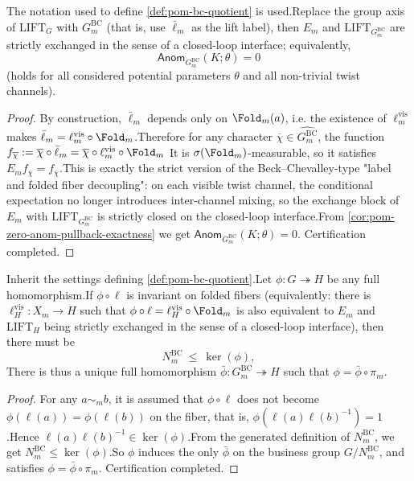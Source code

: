 \begin{proposition}  \label{prop:pom-bc-quotient-strictify}The notation used to define \ref{def:pom-bc-quotient} is used.Replace the group axis of \(\mathrm{LIFT}_G\) with \(G^{\mathrm{BC}}_m\) (that is, use \(\bar\ell_m\) as the lift label), then \(E_m\) and \(\mathrm{LIFT}_{G^{\mathrm{BC}}_m}\) are strictly exchanged in the sense of a closed-loop interface; equivalently,\[
\mathsf{Anom}_{G^{\mathrm{BC}}_m}(K;\theta)=0
\]
(holds for all considered potential parameters \(\theta\) and all non-trivial twist channels).\end{proposition}
\begin{proof}
By construction, \(\bar\ell_m\) depends only on \(\Fold_m(a)\), i.e. the existence of \(\ell^{\mathrm{vis}}_m\) makes \(\bar\ell_m=\ell^{\mathrm{vis}}_m\circ \Fold_m\).Therefore for any character \(\overline\chi\in\widehat{G^{\mathrm{BC}}_m}\), the function\(
f_{\overline\chi}:=\overline\chi\circ \bar\ell_m
=
\overline\chi\circ \ell^{\mathrm{vis}}_m\circ \Fold_m
\)
It is \(\sigma(\Fold_m)\)-measurable, so it satisfies \(E_m f_{\overline\chi}=f_{\overline\chi}\).This is exactly the strict version of the Beck--Chevalley-type "label and folded fiber decoupling": on each visible twist channel, the conditional expectation no longer introduces inter-channel mixing, so the exchange block of \(E_m\) with \(\mathrm{LIFT}_{G^{\mathrm{BC}}_m}\) is strictly closed on the closed-loop interface.From \ref{cor:pom-zero-anom-pullback-exactness} we get \(\mathsf{Anom}_{G^{\mathrm{BC}}_m}(K;\theta)=0\). Certification completed.\end{proof}

\begin{proposition}\label{prop:pom-bc-quotient-universal}Inherit the settings defining \ref{def:pom-bc-quotient}.Let \(\phi:G\twoheadrightarrow H\) be any full homomorphism.If \(\phi\circ \ell\) is invariant on folded fibers (equivalently: there is \(\ell_H^{\mathrm{vis}}:X_m\to H\) such that \(\phi\circ\ell=\ell_H^{\mathrm{vis}}\circ\Fold_m\) is also equivalent to \(E_m\) and \(\mathrm{LIFT}_H\) being strictly exchanged in the sense of a closed-loop interface), then there must be\[
N^{\mathrm{BC}}_m\ \le\ \ker(\phi),
\]
There is thus a unique full homomorphism \(\bar\phi:G^{\mathrm{BC}}_m\twoheadrightarrow H\) such that \(\phi=\bar\phi\circ \pi_m\).\end{proposition}
\begin{proof}
For any \(a\sim_m b\), it is assumed that \(\phi\circ\ell\) does not become \(\phi(\ell(a))=\phi(\ell(b))\) on the fiber, that is, \(\phi(\ell(a)\ell(b)^{-1})=1\).Hence \(\ell(a)\ell(b)^{-1}\in\ker(\phi)\).From the generated definition of \(N^{\mathrm{BC}}_m\), we get \(N^{\mathrm{BC}}_m\le \ker(\phi)\).So \(\phi\) induces the only \(\bar\phi\) on the business group \(G/N^{\mathrm{BC}}_m\), and satisfies \(\phi=\bar\phi\circ\pi_m\). Certification completed.\end{proof}

